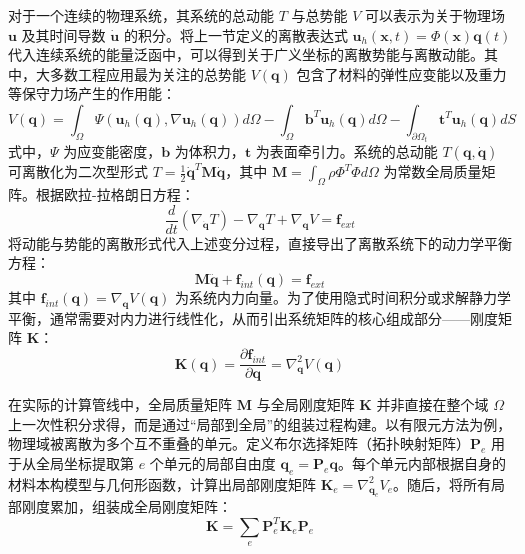 对于一个连续的物理系统，其系统的总动能 $T$ 与总势能 $V$ 可以表示为关于物理场 $\mathbf{u}$ 及其时间导数 $\mathbf{\dot{u}}$ 的积分。将上一节定义的离散表达式 $\mathbf{u}_h(\mathbf{x}, t) = \Phi(\mathbf{x}) \mathbf{q}(t)$ 代入连续系统的能量泛函中，可以得到关于广义坐标的离散势能与离散动能。其中，大多数工程应用最为关注的总势能 $V(\mathbf{q})$ 包含了材料的弹性应变能以及重力等保守力场产生的作用能：
\begin{equation}
    V(\mathbf{q}) = \int_{\Omega} \Psi(\mathbf{u}_h(\mathbf{q}), \nabla \mathbf{u}_h(\mathbf{q})) d\Omega - \int_{\Omega} \mathbf{b}^T \mathbf{u}_h(\mathbf{q}) d\Omega - \int_{\partial \Omega_t} \mathbf{t}^T \mathbf{u}_h(\mathbf{q}) dS
\end{equation}
式中，$\Psi$ 为应变能密度，$\mathbf{b}$ 为体积力，$\mathbf{t}$ 为表面牵引力。系统的总动能 $T(\mathbf{q}, \mathbf{\dot{q}})$ 可离散化为二次型形式 $T = \frac{1}{2} \mathbf{\dot{q}}^T \mathbf{M} \mathbf{\dot{q}}$，其中 $\mathbf{M} = \int_{\Omega} \rho \Phi^T \Phi d\Omega$ 为常数全局质量矩阵。根据欧拉-拉格朗日方程：
\begin{equation}
    \frac{d}{dt} \left( \nabla_{\mathbf{\dot{q}}} T \right) - \nabla_{\mathbf{q}} T + \nabla_{\mathbf{q}} V = \mathbf{f}_{ext}
\end{equation}
将动能与势能的离散形式代入上述变分过程，直接导出了离散系统下的动力学平衡方程：
\begin{equation}
    \mathbf{M} \mathbf{\ddot{q}} + \mathbf{f}_{int}(\mathbf{q}) = \mathbf{f}_{ext}
\end{equation}
其中 $\mathbf{f}_{int}(\mathbf{q}) = \nabla_{\mathbf{q}} V(\mathbf{q})$ 为系统内力向量。为了使用隐式时间积分或求解静力学平衡，通常需要对内力进行线性化，从而引出系统矩阵的核心组成部分——刚度矩阵 $\mathbf{K}$：
\begin{equation}
    \mathbf{K}(\mathbf{q}) = \frac{\partial \mathbf{f}_{int}}{\partial \mathbf{q}} = \nabla^2_{\mathbf{q}} V(\mathbf{q})
\end{equation}

在实际的计算管线中，全局质量矩阵 $\mathbf{M}$ 与全局刚度矩阵 $\mathbf{K}$ 并非直接在整个域 $\Omega$ 上一次性积分求得，而是通过“局部到全局”的组装过程构建。以有限元方法为例，物理域被离散为多个互不重叠的单元。定义布尔选择矩阵（拓扑映射矩阵）$\mathbf{P}_e$ 用于从全局坐标提取第 $e$ 个单元的局部自由度 $\mathbf{q}_e = \mathbf{P}_e \mathbf{q}$。每个单元内部根据自身的材料本构模型与几何形函数，计算出局部刚度矩阵 $\mathbf{K}_e = \nabla^2_{\mathbf{q}_e} V_e$。随后，将所有局部刚度累加，组装成全局刚度矩阵：
\begin{equation}
    \mathbf{K} = \sum_{e} \mathbf{P}_e^T \mathbf{K}_e \mathbf{P}_e
\end{equation}


